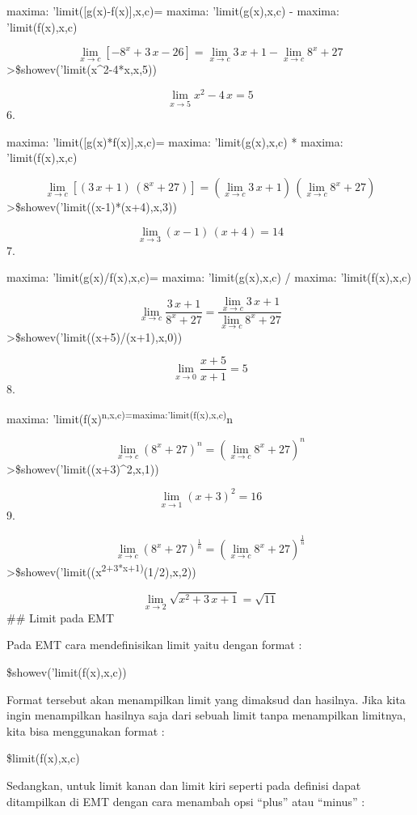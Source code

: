 \documentclass[
]{book}
\begin{document}
maxima: 'limit({[}g(x)-f(x){]},x,c)= maxima: 'limit(g(x),x,c) - maxima: 'limit(f(x),x,c)

\[\lim_{x\rightarrow c}{\left[ -8^{x}+3\,x-26 \right] }=\lim_{x  \rightarrow c}{3\,x+1}-\lim_{x\rightarrow c}{8^{x}+27}\]\textgreater\$showev('limit(x\^{}2-4*x,x,5))

\[\lim_{x\rightarrow 5}{x^2-4\,x}=5\]6.

maxima: 'limit({[}g(x)*f(x){]},x,c)= maxima: 'limit(g(x),x,c) * maxima: 'limit(f(x),x,c)

\[\lim_{x\rightarrow c}{\left[ \left(3\,x+1\right)\,\left(8^{x}+27  \right) \right] }=\left(\lim_{x\rightarrow c}{3\,x+1}\right)\,\left(  \lim_{x\rightarrow c}{8^{x}+27}\right)\]\textgreater\$showev('limit((x-1)*(x+4),x,3))

\[\lim_{x\rightarrow 3}{\left(x-1\right)\,\left(x+4\right)}=14\]7.

maxima: 'limit(g(x)/f(x),x,c)= maxima: 'limit(g(x),x,c) / maxima: 'limit(f(x),x,c)

\[\lim_{x\rightarrow c}{\frac{3\,x+1}{8^{x}+27}}=\frac{\lim_{x  \rightarrow c}{3\,x+1}}{\lim_{x\rightarrow c}{8^{x}+27}}\]\textgreater\$showev('limit((x+5)/(x+1),x,0))

\[\lim_{x\rightarrow 0}{\frac{x+5}{x+1}}=5\]8.

maxima: 'limit(f(x)\textsuperscript{n,x,c)=maxima:'limit(f(x),x,c)}n

\[\lim_{x\rightarrow c}{\left(8^{x}+27\right)^{n}}=\left(\lim_{x  \rightarrow c}{8^{x}+27}\right)^{n}\]\textgreater\$showev('limit((x+3)\^{}2,x,1))

\[\lim_{x\rightarrow 1}{\left(x+3\right)^2}=16\]9.

\[\lim_{x\rightarrow c}{\left(8^{x}+27\right)^{\frac{1}{n}}}=\left(  \lim_{x\rightarrow c}{8^{x}+27}\right)^{\frac{1}{n}}\]\textgreater\$showev('limit((x\textsuperscript{2+3*x+1)}(1/2),x,2))

\[\lim_{x\rightarrow 2}{\sqrt{x^2+3\,x+1}}=\sqrt{11}\]\#\# Limit pada EMT

Pada EMT cara mendefinisikan limit yaitu dengan format :

\$showev('limit(f(x),x,c))

Format tersebut akan menampilkan limit yang dimaksud dan hasilnya. Jika kita ingin menampilkan hasilnya saja dari sebuah limit tanpa menampilkan limitnya, kita bisa menggunakan format :

\$limit(f(x),x,c)

Sedangkan, untuk limit kanan dan limit kiri seperti pada definisi dapat ditampilkan di EMT dengan cara menambah opsi ``plus'' atau ``minus'' :
\end{document}
